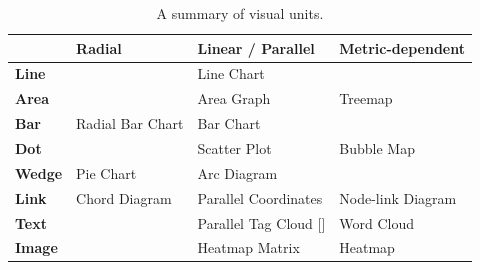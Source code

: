 \documentclass[review,journal]{vgtc}         %
\newcommand\Tstrut{\rule{0pt}{2.6ex}}         %
\newcommand\Bstrut{\rule[-0.9ex]{0pt}{0pt}}   %
\begin{document}
\begin{table}[tb]
  \small
  \centering
  \begin{tabular}{p{0.8cm}|p{2.1cm}|p{2.1cm}|p{2.1cm}}
  \toprule
  &\textbf{Radial} & \textbf{Linear / Parallel} & \textbf{Metric-dependent} \Tstrut\Bstrut  \\ 
  \midrule
  \textbf{Line} & & Line Chart & \\ 
  \midrule
  \textbf{Area} & &Area Graph  & Treemap \\ 
  \midrule
  \textbf{Bar} &Radial Bar Chart & Bar Chart & \\
  \midrule
  \textbf{Dot} & &Scatter Plot &Bubble Map \\
  \midrule
  \textbf{Wedge} & Pie Chart &Arc Diagram & \\
  \midrule
  \textbf{Link} &Chord Diagram &Parallel Coordinates &Node-link Diagram \\
  \midrule
  \textbf{Text} & &Parallel Tag Cloud [] &Word Cloud \\
  \midrule
  \textbf{Image} & &Heatmap Matrix &Heatmap \\

  \bottomrule

  \end{tabular}
  \vspace{1mm}
  \caption{A summary of visual units.}
  \label{tab:unit}
\end{table}
\end{document}
